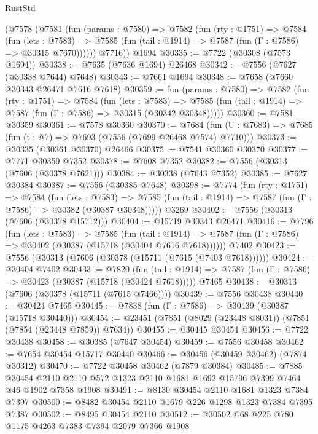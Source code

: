 \begin{lexlean}{RustStd}
\begin{coremodule}
{\begin{coremodule}
{{{{{{{{{{{{{{{{{{{{{{{{{{{{{{{{{{{{{{{{{{{      (@7578
        (@7581
          (fun (params : @7580) =>
          @7582
            (fun (rty : @1751) =>
            @7584
              (fun (lets : @7583) =>
              @7585 (fun (tail : @1914) => @7587 (fun (Γ : @7586) => @30315 @7670))))))
        @7716))
    @1694
@30335 := @7722 (@30308 (@7573 @1694))
@30338 := @7635 (@7636 @1694) @26468
@30342 := @7556 (@7627 (@30338 @7644) @7648)
@30343 := @7661 @1694
@30348 := @7658 (@7660 @30343 @26471 @7616 @7618)
@30359 := fun (params : @7580) =>
  @7582
    (fun (rty : @1751) =>
    @7584
      (fun (lets : @7583) =>
      @7585 (fun (tail : @1914) => @7587 (fun (Γ : @7586) => @30315 (@30342 @30348)))))
@30360 := @7581 @30359
@30361 := @7578 @30360
@30370 := @7684
    (fun (U : @7683) => @7685 (fun (t : @7) => @7693 (@7556 (@7699 @26468 @7574) @7710)))
@30373 := @30335 (@30361 @30370) @26466
@30375 := @7541 @30360 @30370
@30377 := @7771 @30359 @7352
@30378 := @7608 @7352
@30382 := @7556 (@30313 (@7606 (@30378 @7621)))
@30384 := @30338 (@7643 @7352)
@30385 := @7627 @30384
@30387 := @7556 (@30385 @7648)
@30398 := @7774
    (fun (rty : @1751) =>
    @7584
      (fun (lets : @7583) =>
      @7585 (fun (tail : @1914) => @7587 (fun (Γ : @7586) => @30382 (@30387 @30348)))))
    @3269
@30402 := @7556 (@30313 (@7606 (@30378 @15712)))
@30404 := @15719 @30343 @26471
@30416 := @7796
    (fun (lets : @7583) =>
    @7585
      (fun (tail : @1914) =>
      @7587 (fun (Γ : @7586) => @30402 (@30387 (@15718 (@30404 @7616 @7618))))))
    @7402
@30423 := @7556 (@30313 (@7606 (@30378 (@15711 (@7615 (@7403 @7618))))))
@30424 := @30404 @7402
@30433 := @7820
    (fun (tail : @1914) => @7587 (fun (Γ : @7586) => @30423 (@30387 (@15718 (@30424 @7618)))))
    @7465
@30438 := @30313 (@7606 (@30378 (@15711 (@7615 @7466))))
@30439 := @7556 @30438
@30440 := @30424 @7465
@30445 := @7838 (fun (Γ : @7586) => @30439 (@30387 (@15718 @30440)))
@30454 := @23451 (@7851 (@8029 (@23448 @8031)) (@7851 (@7854 (@23448 @7859)) @7634))
@30455 := @30445 @30454
@30456 := @7722 @30438
@30458 := @30385 (@7647 @30454)
@30459 := @7556 @30458
@30462 := @7654 @30454 @15717 @30440
@30466 := @30456 (@30459 @30462) (@7874 @30312)
@30470 := @7722 @30458 @30462 (@7879 @30384)
@30485 := @7885
    @30454
    @2110
    @2110
    @572
    @1323
    @2110
    @1681
    @1692
    @15796
    @7399
    @7464
    @46
    @1902
    @7358
    @1908
@30491 := @8130 @30454 @2110 @1681 @1323 @7384 @7397
@30500 := @8482 @30454 @2110 @1679 @226 @1298 @1323 @7384 @7395 @7387
@30502 := @8495 @30454 @2110
@30512 := @30502 @68 @225 @780 @1175 @4263 @7383 @7394 @2079 @7366 @1908
}}}}}}}}}}}}}}}}}}}}}}}}}}}}}}}}}}}}}}}}}}}
\end{coremodule}}
\end{coremodule}
\end{lexlean}
